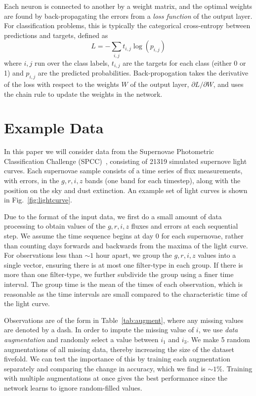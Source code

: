 \documentclass[twocolumn]{aastex61}
\begin{document}
 Each neuron is connected to another by a weight matrix, and the optimal weights are found by back-propagating the errors from a {\em loss function} of the output layer. For classification problems, this is typically the categorical cross-entropy between predictions and targets, defined as 
\begin{equation}
L= -\sum_{i,j} t_{i,j} \log \left( p_{i,j} \right)
\end{equation}
where $i,j$ run over the class labels, $t_{i,j}$ are the targets for each class (either 0 or 1) and $p_{i,j}$ are the predicted probabilities. Back-propogation takes the derivative of the loss with respect to the weights $W$ of the output layer, $\partial L/\partial W$, and uses the chain rule to update the weights in the network.

\section{Example Data}

In this paper we will consider data from the Supernovae Photometric Classification Challenge (SPCC)~\cite{Kessler:2010wk,Kessler:2010qj}, consisting of 21319 simulated supernove light curves.  Each supernovae sample consists of a time series of flux measurements, with errors, in the $g,r,i,z$ bands (one band for each timestep), along with the position on the sky and dust extinction. An example set of light curves is shown in Fig.~\ref{fig:lightcurve}. 

Due to the format of the input data, we first do a small amount of data processing to obtain values of the $g,r,i,z$ fluxes and errors at each sequential step.  We assume the time sequence begins at day 0 for each supernovae, rather than counting days forwards and backwards from the maxima of the light curve. For observations less than $\sim1$ hour apart, we group the $g,r,i,z$ values into a single vector, ensuring there is at most one filter-type in each group. If there is more than one filter-type, we further subdivide the group using a finer time interval.  The group time is the mean of the times of each observation, which is reasonable as the time intervals are small compared to the characteristic time of the light curve. 

Observations are of the form in Table~\ref{tab:augment}, where any missing values are denoted by a dash. In order to impute the missing value of $i$, we use {\em data augmentation} and randomly select a value between $i_1$ and $i_3$. We make 5 random augmentations of all missing data, thereby increasing the size of the dataset fivefold. We can test the importance of this by training each augmentation separately and comparing the change in accuracy, which we find is $\sim 1\%$. Training with multiple augmentations at once gives the best performance since the network learns to ignore random-filled values.
\end{document}
